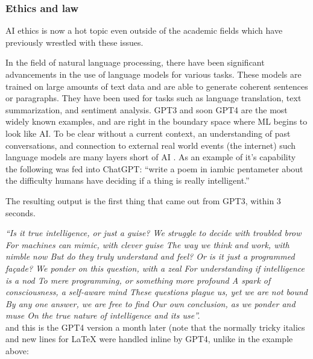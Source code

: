\subsubsection{Ethics and law}
AI ethics is now a hot topic even outside of the academic fields which have previously wrestled with these issues.\par
In the field of natural language processing, there have been significant advancements in the use of language models for various tasks. These models are trained on large amounts of text data and are able to generate coherent sentences or paragraphs. They have been used for tasks such as language translation, text summarization, and sentiment analysis. GPT3 and soon GPT4 are the most widely known examples, and are right in the boundary space where ML begins to look like AI. To be clear without a current context, an understanding of past conversations, and connection to external real world events (the internet) such language models are many layers short of AI \cite{elkins2020can, marcus2020gpt}. As an example of it's capability the following was fed into ChatGPT: ``write a poem in iambic pentameter about the difficulty humans have deciding if a thing is really intelligent.''\par
The resulting output is the first thing that came out from GPT3, within 3 seconds.\par
\textit{``Is it true intelligence, or just a guise?
We struggle to decide with troubled brow
For machines can mimic, with clever guise
The way we think and work, with nimble now
But do they truly understand and feel?
Or is it just a programmed façade?
We ponder on this question, with a zeal
For understanding if intelligence is a nod
To mere programming, or something more profound
A spark of consciousness, a self-aware mind
These questions plague us, yet we are not bound
By any one answer, we are free to find
Our own conclusion, as we ponder and muse
On the true nature of intelligence and its use''.}\\
and this is the GPT4 version a month later (note that the normally tricky italics and new lines for LaTeX were handled inline by GPT4, unlike in the example above:
\newpage
